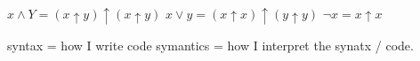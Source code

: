 
$x \land Y = (x \uparrow y) \uparrow (x \uparrow y)$
$x \lor y = (x \uparrow x) \uparrow (y \uparrow y)$
$\neg x = x \uparrow x$

syntax = how I write code
symantics = how I interpret the synatx / code.